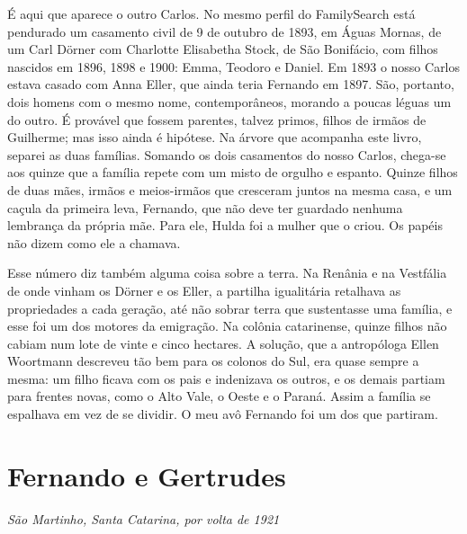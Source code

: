 \documentclass[
  brazilian,
  11pt,
  openany]{book}
\begin{document}
É aqui que aparece o outro Carlos. No mesmo perfil do FamilySearch está
pendurado um casamento civil de 9 de outubro de 1893, em Águas Mornas,
de um Carl Dörner com Charlotte Elisabetha Stock, de São Bonifácio, com
filhos nascidos em 1896, 1898 e 1900: Emma, Teodoro e Daniel. Em 1893 o
nosso Carlos estava casado com Anna Eller, que ainda teria Fernando em
1897. São, portanto, dois homens com o mesmo nome, contemporâneos,
morando a poucas léguas um do outro. É provável que fossem parentes,
talvez primos, filhos de irmãos de Guilherme; mas isso ainda é hipótese.
Na árvore que acompanha este livro, separei as duas famílias. Somando os
dois casamentos do nosso Carlos, chega-se aos quinze que a família
repete com um misto de orgulho e espanto. Quinze filhos de duas mães,
irmãos e meios-irmãos que cresceram juntos na mesma casa, e um caçula da
primeira leva, Fernando, que não deve ter guardado nenhuma lembrança da
própria mãe. Para ele, Hulda foi a mulher que o criou. Os papéis não
dizem como ele a chamava.

Esse número diz também alguma coisa sobre a terra. Na Renânia e na
Vestfália de onde vinham os Dörner e os Eller, a partilha igualitária
retalhava as propriedades a cada geração, até não sobrar terra que
sustentasse uma família, e esse foi um dos motores da emigração. Na
colônia catarinense, quinze filhos não cabiam num lote de vinte e cinco
hectares. A solução, que a antropóloga Ellen Woortmann descreveu tão bem
para os colonos do Sul, era quase sempre a mesma: um filho ficava com os
pais e indenizava os outros, e os demais partiam para frentes novas,
como o Alto Vale, o Oeste e o Paraná. Assim a família se espalhava em
vez de se dividir. O meu avô Fernando foi um dos que partiram.

\section{Fernando e Gertrudes}\label{fernando-e-gertrudes}

\emph{São Martinho, Santa Catarina, por volta de 1921}
\end{document}
